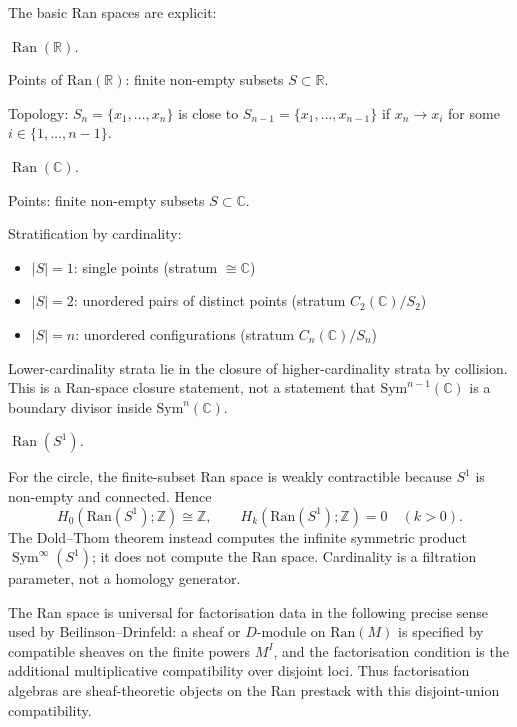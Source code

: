 \begin{computation}
The basic Ran spaces are explicit:

\emph{$\operatorname{Ran}(\mathbb{R})$.}

Points of $\text{Ran}(\mathbb{R})$: finite non-empty subsets
$S \subset \mathbb{R}$.

Topology: $S_n = \{x_1, \ldots, x_n\}$ is close to $S_{n-1} = \{x_1, \ldots, x_{n-1}\}$
if $x_n \to x_i$ for some $i \in \{1, \ldots, n-1\}$.

\emph{$\operatorname{Ran}(\mathbb{C})$.}

Points: finite non-empty subsets $S \subset \mathbb{C}$.

Stratification by cardinality:
\begin{itemize}
\item $|S| = 1$: single points (stratum $\cong \mathbb{C}$)
\item $|S| = 2$: unordered pairs of distinct points
      (stratum $C_2(\mathbb C)/S_2$)
\item $|S| = n$: unordered configurations
      (stratum $C_n(\mathbb C)/S_n$)
\end{itemize}

Lower-cardinality strata lie in the closure of higher-cardinality
strata by collision. This is a Ran-space closure statement, not a
statement that $\text{Sym}^{n-1}(\mathbb C)$ is a boundary divisor
inside $\text{Sym}^n(\mathbb C)$.

\emph{$\operatorname{Ran}(S^1)$.}

For the circle, the finite-subset Ran space is weakly contractible
because $S^1$ is non-empty and connected. Hence
\[
H_0(\text{Ran}(S^1);\mathbb Z)\cong\mathbb Z,
\qquad
H_k(\text{Ran}(S^1);\mathbb Z)=0\quad(k>0).
\]
The Dold--Thom theorem instead computes the infinite symmetric product
$\operatorname{Sym}^{\infty}(S^1)$; it does not compute the Ran space.
Cardinality is a filtration parameter, not a homology generator.
\end{computation}

\begin{remark}
The Ran space is universal for factorisation data in the following
precise sense used by Beilinson--Drinfeld: a sheaf or $D$-module on
$\mathrm{Ran}(M)$ is specified by compatible sheaves on the finite
powers $M^I$, and the factorisation condition is the additional
multiplicative compatibility over disjoint loci. Thus factorisation
algebras are sheaf-theoretic objects on the Ran prestack with this disjoint-union
compatibility.
\end{remark}

